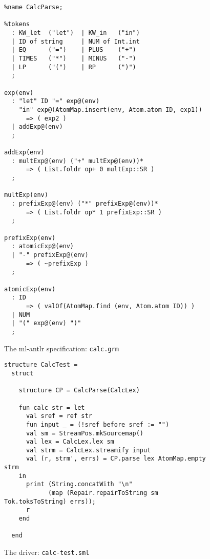 \begin{figure}[p]
\begin{verbatim}
%name CalcParse;

%tokens
  : KW_let  ("let")  | KW_in   ("in")
  | ID of string     | NUM of Int.int
  | EQ      ("=")    | PLUS    ("+")
  | TIMES   ("*")    | MINUS   ("-")
  | LP      ("(")    | RP      (")")
  ;
  
exp(env)
  : "let" ID "=" exp@(env) 
    "in" exp@(AtomMap.insert(env, Atom.atom ID, exp1))
      => ( exp2 )
  | addExp@(env)
  ;
  
addExp(env)
  : multExp@(env) ("+" multExp@(env))*
      => ( List.foldr op+ 0 multExp::SR )
  ;
  
multExp(env)
  : prefixExp@(env) ("*" prefixExp@(env))*
      => ( List.foldr op* 1 prefixExp::SR )
  ;
  
prefixExp(env)
  : atomicExp@(env)
  | "-" prefixExp@(env)
      => ( ~prefixExp )
  ;
  
atomicExp(env)
  : ID  
      => ( valOf(AtomMap.find (env, Atom.atom ID)) )
  | NUM
  | "(" exp@(env) ")"
  ;
\end{verbatim}
\caption{The ml-antlr specification: {\tt calc.grm}}
\label{fig:calc-grm}
\end{figure}

\begin{figure}
\begin{verbatim}
structure CalcTest =
  struct

    structure CP = CalcParse(CalcLex)

    fun calc str = let
      val sref = ref str
      fun input _ = (!sref before sref := "")
      val sm = StreamPos.mkSourcemap()
      val lex = CalcLex.lex sm
      val strm = CalcLex.streamify input
      val (r, strm', errs) = CP.parse lex AtomMap.empty strm
    in
      print (String.concatWith "\n" 
            (map (Repair.repairToString sm Tok.toksToString) errs));
      r
    end

  end
\end{verbatim}
\caption{The driver: {\tt calc-test.sml}}
\label{fig:calc-test}
\end{figure}
